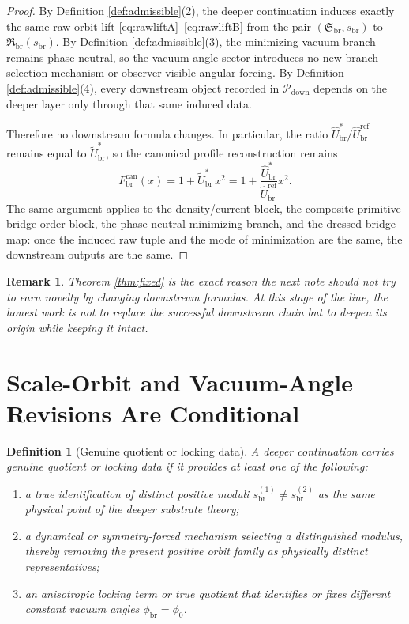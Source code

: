 \documentclass[11pt]{article}
\newcommand{\RespShapeEq}{\widetilde U_{\mathrm{br}}^{\ast}}
\newcommand{\RespRawRef}{\widehat U_{\mathrm{br}}^{\mathrm{ref}}}
\newcommand{\RespRawEq}{\widehat U_{\mathrm{br}}^{\ast}}
\newcommand{\RespVacPhase}{\phi_{\mathrm{br}}}
\newcommand{\CurvProfileCan}{F_{\mathrm{br}}^{\mathrm{can}}}
\newcommand{\DownPkg}{\mathscr P_{\mathrm{down}}}
\newcommand{\ShapeTuple}{\mathfrak S_{\mathrm{br}}}
\newcommand{\RawTuple}{\mathfrak R_{\mathrm{br}}}
\newcommand{\ScaleMod}{s_{\mathrm{br}}}
\newtheorem{definition}{Definition}
\newtheorem{remark}{Remark}
\begin{document}
\begin{proof}
By Definition \ref{def:admissible}(2), the deeper continuation induces exactly the same raw-orbit lift \eqref{eq:rawliftA}--\eqref{eq:rawliftB} from the pair \((\ShapeTuple,\ScaleMod)\) to \(\RawTuple(\ScaleMod)\). By Definition \ref{def:admissible}(3), the minimizing vacuum branch remains phase-neutral, so the vacuum-angle sector introduces no new branch-selection mechanism or observer-visible angular forcing. By Definition \ref{def:admissible}(4), every downstream object recorded in \(\DownPkg\) depends on the deeper layer only through that same induced data.

Therefore no downstream formula changes. In particular, the ratio \(\RespRawEq/\RespRawRef\) remains equal to \(\RespShapeEq\), so the canonical profile reconstruction remains
\[
\CurvProfileCan(x)=1+\RespShapeEq\,x^2
=
1+\frac{\RespRawEq}{\RespRawRef}x^2.
\]
The same argument applies to the density/current block, the composite primitive bridge-order block, the phase-neutral minimizing branch, and the dressed bridge map: once the induced raw tuple and the mode of minimization are the same, the downstream outputs are the same.
\end{proof}

\begin{remark}
Theorem \ref{thm:fixed} is the exact reason the next note should not try to earn novelty by changing downstream formulas. At this stage of the line, the honest work is not to replace the successful downstream chain but to deepen its origin while keeping it intact.
\end{remark}

\section{Scale-Orbit and Vacuum-Angle Revisions Are Conditional}

\begin{definition}[Genuine quotient or locking data]
\label{def:quotient}
A deeper continuation carries \emph{genuine quotient or locking data} if it provides at least one of the following:
\begin{enumerate}
    \item a true identification of distinct positive moduli \(\ScaleMod^{(1)}\neq \ScaleMod^{(2)}\) as the same physical point of the deeper substrate theory;
    \item a dynamical or symmetry-forced mechanism selecting a distinguished modulus, thereby removing the present positive orbit family as physically distinct representatives;
    \item an anisotropic locking term or true quotient that identifies or fixes different constant vacuum angles \(\RespVacPhase=\phi_0\).
\end{enumerate}
\end{definition}
\end{document}
